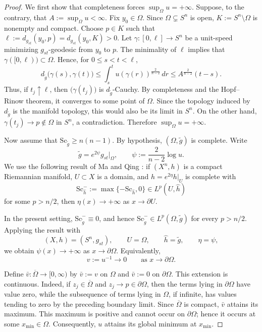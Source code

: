 \documentclass[12pt,oneside,a4paper]{article}
\theoremstyle{mytheorem}
\theoremstyle{remark}
\theoremstyle{definition}
\begin{document}
\begin{proof}
We first show that completeness forces \(\sup_{\Omega}u=+\infty\).
Suppose, to the contrary, that
\(A:=\sup_{\Omega}u<\infty\).
Fix \(y_0\in\Omega\). Since \(\Omega\subsetneq S^n\) is open,
\(K:=S^n\setminus\Omega\) is nonempty and compact. Choose \(p\in K\) such that
\(\ell:=d_{g_{st}}(y_0,p)=d_{g_{st}}(y_0,K)>0\).
Let \(\gamma\colon[0,\ell]\to S^n\) be a unit-speed minimizing
\(g_{st}\)-geodesic from \(y_0\) to \(p\). The minimality of \(\ell\)
implies that \(\gamma([0,\ell))\subset\Omega\). Hence, for
\(0\le s<t<\ell\),
\[
d_{\tilde g}\bigl(\gamma(s),\gamma(t)\bigr)
\leq
\int_s^t u(\gamma(r))^{\frac{2}{n-2}}\,dr
\leq A^{\frac{2}{n-2}}(t-s).
\]
Thus, if \(t_j\uparrow\ell\), then \(\bigl(\gamma(t_j)\bigr)\) is
\(d_{\tilde g}\)-Cauchy. By completeness and the Hopf--Rinow theorem,
it converges to some point of \(\Omega\). Since the topology induced by
\(d_{\tilde g}\) is the manifold topology, this would also be its limit
in \(S^n\). On the other hand,
\(\gamma(t_j)\to p\notin\Omega\) in \(S^n\), a contradiction.
Therefore \(\sup_{\Omega}u=+\infty\).

Now assume that \(\mathrm{Sc}_{\tilde g}\geq n(n-1)\). By hypothesis,
\((\Omega,\tilde g)\) is complete. Write
\[
\tilde g=e^{2\psi}g_{st}\big|_\Omega,
\qquad
\psi:=\frac{2}{n-2}\log u.
\]
We use the following result of Ma and Qing
\cite[Lemma~3.1]{zbMATH07456625}: if \((X^n,h)\) is a compact
Riemannian manifold, \(U\subset X\) is a domain, and
\(\widehat h=e^{2\eta}h\big|_U\) is complete with
\[
\mathrm{Sc}_{\widehat h}^{-}
:=\max\{-\mathrm{Sc}_{\widehat h},0\}
\in L^p(U,\widehat h)
\]
for some \(p>n/2\), then
\(\eta(x)\to+\infty\) as \(x\to\partial U\).

In the present setting,
\(\mathrm{Sc}_{\tilde g}^{-}\equiv0\), and hence
\(\mathrm{Sc}_{\tilde g}^{-}\in L^p(\Omega,\tilde g)\) for every
\(p>n/2\). Applying the result with
\[
(X,h)=(S^n,g_{st}),\qquad
U=\Omega,\qquad
\widehat h=\tilde g,\qquad
\eta=\psi,
\]
we obtain \(\psi(x)\to+\infty\) as \(x\to\partial\Omega\).
Equivalently,
\[
v:=u^{-1}\longrightarrow0
\qquad\text{as }x\to\partial\Omega.
\]





Define \(\bar v\colon\overline\Omega\to[0,\infty)\) by
\(\bar v:=v\) on \(\Omega\) and \(\bar v:=0\) on \(\partial\Omega\).
This extension is continuous.
Indeed, if \(z_j\in\overline\Omega\) and
\(z_j\to p\in\partial\Omega\), then the terms lying in
\(\partial\Omega\) have value zero, while the subsequence of terms
lying in \(\Omega\), if infinite, has values tending to zero by the
preceding boundary limit. Since \(\overline\Omega\) is compact,
\(\bar v\) attains its maximum. This maximum is positive and cannot
occur on \(\partial\Omega\); hence it occurs at some
\(x_{\min}\in\Omega\). Consequently, \(u\) attains its global minimum
at \(x_{\min}\).


\end{proof}
\end{document}

